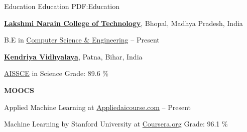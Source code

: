 \documentclass[letterpaper,MMMyyyy,nonstopmode]{simpleresumecv}
\begin{document}
        \begin{Body}
        
        
            \Section
            {Education}
            {Education}
            {PDF:Education}
            
                \Entry
                    \href{http://http://www.lnctgroup.in/LNCT}
                    {\textbf{Lakshmi Narain College of Technology}},
                    Bhopal, Madhya Pradesh, India
                    
                    \Gap

                    \BulletItem
                        B.E in 
                        \href{http://www.lnctgroup.in/Bachelor-Of-Engineering/Computer-Science-Engineering}
                            {Computer Science \& Engineering}
                        \hfill
                         -- Present
                
                
                \BigGap


                \Entry
                    \href{http://http://kvkankarbaghpatna.org.in/}
                    {\textbf{Kendriya Vidhyalaya}},
                    Patna, Bihar, India
                    
                    \Gap

                    \BulletItem
                        \href{http://cbse.nic.in/newsite/index.html}
                            {AISSCE}
                            in Science
                        \hfill
                        \SubBulletItem
                            Grade: 89.6 \%
                

                \BigGap

                
                \Entry
                    \textbf{MOOCS}
                    
                    \BulletItem
                        Applied Machine Learning at \href{https://www.appliedaicourse.com/}{Appliedaicourse.com}
                        \hfill
                         -- Present
                    
                    \Gap
                    
                    \BulletItem
                        Machine Learning by Stanford University at \href{https://coursera.org}{Coursera.org}
                        \SubBulletItem
                            Grade: 96.1 \%
            

\end{Body}
\end{document}
